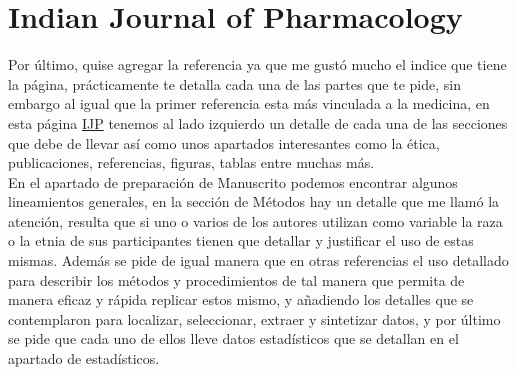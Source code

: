 \documentclass{article}
\theoremstyle{mytheoremstyle}
\theoremstyle{mytheoremstyle}
\theoremstyle{myproblemstyle}
\begin{document}
    \section*{Indian Journal of Pharmacology}
    Por último, quise agregar la referencia  \cite{international2006uniform} ya que me gustó mucho el indice que tiene la página, prácticamente te 
    detalla cada una de las partes que te pide, sin embargo al igual que la primer referencia esta más vinculada a la 
    medicina, en esta página \href{https://ijp-online.com/article.asp?issn=0253-7613;year=2006;volume=38;issue=2;spage=149;epage=162;aulast=International#IV.%20Manuscript%20preparation%20and%20submission}{IJP}
    tenemos al lado izquierdo un detalle de cada una de las secciones que debe de llevar así como unos apartados interesantes
    como la ética, publicaciones, referencias, figuras, tablas entre muchas más.
    \\ En el apartado de preparación de Manuscrito podemos encontrar algunos lineamientos generales, en la sección de 
    Métodos hay un detalle que me llamó la atención, resulta que si uno o varios de los autores utilizan como variable
    la raza o la etnia de sus participantes tienen que detallar y justificar el uso de estas mismas.
    Además se pide de igual manera que en otras referencias el uso detallado para describir los métodos y procedimientos
    de tal manera que permita de manera eficaz y rápida replicar estos mismo, y añadiendo los detalles que se contemplaron 
    para localizar, seleccionar, extraer y sintetizar datos, y por último se pide que cada uno de ellos lleve datos estadísticos
    que se detallan en el apartado de estadísticos.









    \newpage
    
\end{document}
